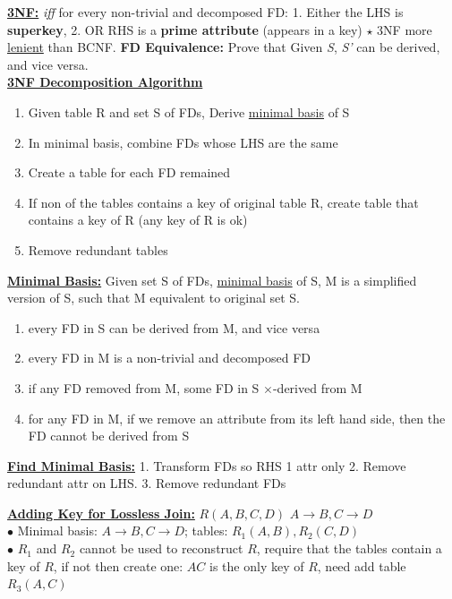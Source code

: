 \documentclass[10pt,landscape]{article}
\begin{document}
\begin{multicols*}{3}
\textbf{\underline{3NF:}} \textit{iff} for every non-trivial and decomposed FD:
1. Either the LHS is \textbf{superkey}, 2. OR RHS is a \textbf{prime attribute} (appears in a key)
$\star$ 3NF more \underline{lenient} than BCNF.
\textbf{FD Equivalence:} Prove that Given \textit{S}, \textit{S'} can be derived, and vice versa. \\

\textbf{\underline{3NF Decomposition Algorithm}}
\begin{enumerate}[topsep=0pt,noitemsep,wide=0pt, leftmargin=\dimexpr\labelwidth + 2\labelsep\relax]
    \item Given table R and set S of FDs, Derive \underline{minimal basis} of S
    \item In minimal basis, combine FDs whose LHS are the same
    \item Create a table for each FD remained
    \item If non of the tables contains a key of original table R, create table that contains a key of R (any key of R is ok)
    \item Remove redundant tables
\end{enumerate}

\textbf{\underline{Minimal Basis:}}
Given set S of FDs, \underline{minimal basis} of S, M is a simplified version of S, such that M equivalent to original set S.
\begin{enumerate}[topsep=0pt,noitemsep,wide=0pt, leftmargin=\dimexpr\labelwidth + 2\labelsep\relax]
    \item every	FD in S can	be derived from M, and vice versa
    \item every	FD in M is a non-trivial and decomposed FD
    \item if any FD removed from M, some FD in S $\times$-derived from M
    \item for any FD in	M, if we remove an attribute from its left hand side, then the FD cannot be derived from S
\end{enumerate}

\textbf{\underline{Find Minimal Basis:}} 1. Transform FDs so RHS 1 attr only 2. Remove redundant attr on LHS. 3. Remove redundant FDs

\textbf{\underline{Adding Key for Lossless Join:}} $R(A,B,C,D)$ $A \rightarrow B, C\rightarrow D$ \\
$\bullet$ Minimal basis: $A \rightarrow B, C \rightarrow D$; tables: $R_1(A,B), R_2(C,D)$ \\ 
$\bullet$ $R_1$ and $R_2$ cannot be used to reconstruct $R$, require that the tables contain a key of $R$, if not then create one: $AC$ is the only key of $R$, need add table $R_3(A,C)$


\end{multicols*}
\end{document}
